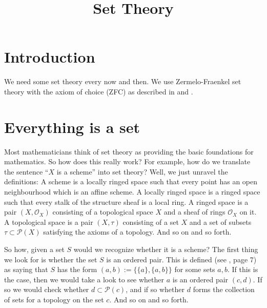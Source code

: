 

%


\title{Set Theory}


\maketitle

\label{section-phantom}

\tableofcontents

\section{Introduction}
\label{section-introduction}

\noindent
We need some set theory every now and then. We use Zermelo-Fraenkel set theory
with the axiom of choice (ZFC) as described in \cite{Kunen} and \cite{Jech}.

\section{Everything is a set}
\label{section-sets-everything}

\noindent
Most mathematicians think of set theory as providing the basic
foundations for mathematics. So how does this really work?
For example, how do we translate the sentence
``$X$ is a scheme'' into set theory? Well, we just unravel the
definitions: A scheme is a locally ringed space such that every
point has an open neighbourhood which is an affine scheme.
A locally ringed space is a ringed space such that every stalk
of the structure sheaf is a local ring. A ringed space is
a pair $(X, \mathcal{O}_X)$ consisting of a topological space
$X$ and a sheaf of rings $\mathcal{O}_X$ on it. A topological
space is a pair $(X, \tau)$ consisting of a set
$X$ and a set of subsets $\tau \subset \mathcal{P}(X)$
satisfying the axioms of a topology. And so on and
so forth.

\medskip\noindent
So how, given a set $S$ would we recognize whether it is a scheme?
The first thing we look for is whether the set $S$ is an ordered pair.
This is defined (see \cite{Jech}, page 7) as saying that $S$
has the form $(a, b) := \{\{a\}, \{a, b\}\}$ for some sets $a, b$. If this is
the case, then we would take a look to see whether $a$ is an
ordered pair $(c, d)$. If so we would check whether
$d \subset \mathcal{P}(c)$, and if so whether $d$ forms the collection
of sets for a topology on the set $c$. And so on and so forth.

